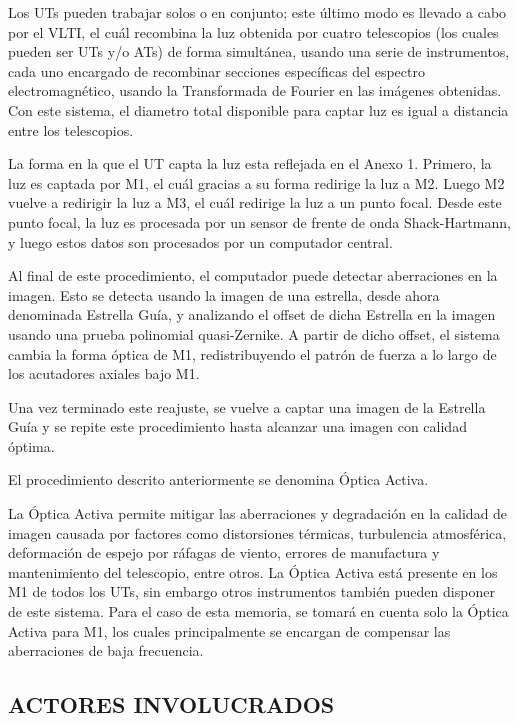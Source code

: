 Los UTs pueden trabajar solos o en conjunto; este último modo es llevado a cabo por el VLTI, el cuál recombina la luz obtenida por cuatro telescopios (los cuales pueden ser UTs y/o ATs) de forma simultánea, usando una serie de instrumentos, cada uno encargado de recombinar secciones específicas del espectro electromagnético,
usando la Transformada de Fourier en las imágenes obtenidas. Con este sistema, el diametro total disponible para captar luz es igual a distancia entre los telescopios\cite{eso2023vlti}. 

La forma en la que el UT capta la luz esta reflejada en el Anexo 1. Primero, la luz es captada por M1, el cuál gracias a su forma redirige la luz a M2. Luego M2 vuelve a redirigir la luz a M3, el cuál 
redirige la luz a un punto focal. Desde este punto focal, la luz es procesada por un sensor de frente de onda Shack-Hartmann, y luego estos datos son procesados por un computador central\cite{eso1998vlt}.

Al final de este procedimiento, el computador puede detectar aberraciones en la imagen. Esto se detecta usando la imagen de una estrella, desde ahora denominada Estrella Guía, y analizando el offset de dicha Estrella en la imagen usando una prueba polinomial quasi-Zernike.
A partir de dicho offset, el sistema cambia la forma óptica de M1, redistribuyendo el patrón de fuerza a lo largo de los acutadores axiales bajo M1\cite{wilson1987active}.

Una vez terminado este reajuste, se vuelve a captar una imagen de la Estrella Guía y se repite este procedimiento hasta alcanzar una imagen con calidad óptima.

El procedimiento descrito anteriormente se denomina Óptica Activa\cite{eso1998vlt}.

La Óptica Activa permite mitigar las aberraciones y degradación en la calidad de imagen causada por factores como distorsiones térmicas, turbulencia atmosférica, deformación de espejo por ráfagas de viento, errores de manufactura y mantenimiento del telescopio, entre otros.
La Óptica Activa está presente en los M1 de todos los UTs, sin embargo otros instrumentos también pueden disponer de este sistema. Para el caso de esta memoria, se tomará en cuenta
solo la Óptica Activa para M1, los cuales principalmente se encargan de compensar las aberraciones de baja frecuencia\cite{wilson1987active}.

\subsection{ACTORES INVOLUCRADOS}

